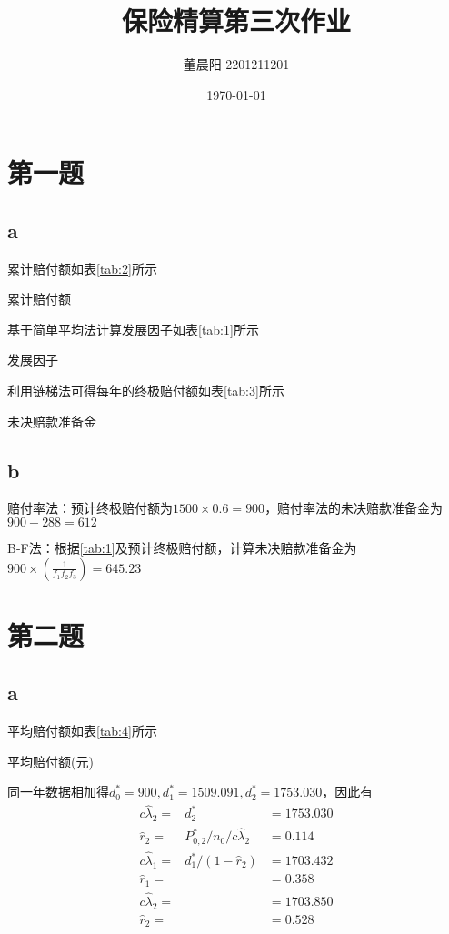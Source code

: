 \documentclass[a4paper,12pt]{ctexart}
\title{保险精算第三次作业}
\author{董晨阳 2201211201}
\date{\today}
\begin{document}
\maketitle
\section*{第一题}
\subsection*{a}
累计赔付额如表\ref{tab:2}所示
\begin{table}[H]
    \centering
    \caption{累计赔付额}\label{tab:2}
\end{table}
基于简单平均法计算发展因子如表\ref{tab:1}所示
\begin{table}[H]
    \centering
    \caption{发展因子}\label{tab:1}
\end{table}
利用链梯法可得每年的终极赔付额如表\ref{tab:3}所示
\begin{table}[H]
    \centering
    \caption{未决赔款准备金}\label{tab:3}
\end{table}
\subsection*{b}
赔付率法：预计终极赔付额为$1500 \times 0.6 = 900$，赔付率法的未决赔款准备金为$900-288 = 612$

B-F法：根据\ref{tab:1}及预计终极赔付额，计算未决赔款准备金为$900\times (\frac{1}{f_1f_2f_3})=645.23$
\section*{第二题}
\subsection*{a}
平均赔付额如表\ref{tab:4}所示
\begin{table}[H]
    \centering
    \caption{平均赔付额(元)}\label{tab:4}
\end{table}
同一年数据相加得$d_0^*=900,d_1^*=1509.091,d_2^*=1753.030$，因此有
\begin{eqnarray*}
    c \hat\lambda_2=&d_2^*&=1753.030\\
    \hat r_2=&P_{0,2}^*/n_0/c \hat\lambda_2&=0.114\\
    c \hat\lambda_1=&d_1^*/(1-\hat r_2)&=1703.432\\
    \hat r_1=&&=0.358\\
    c \hat\lambda_2=&&=1703.850\\
    \hat r_2=&&=0.528
\end{eqnarray*}
\end{document}

